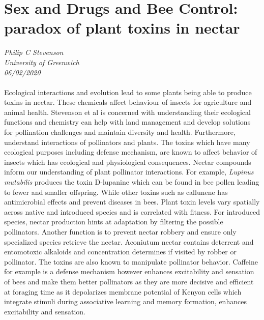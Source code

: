 \documentclass[11pt]{article}
\begin{document}
\section{Sex and Drugs and Bee Control: paradox of plant toxins in nectar}
\textit{Philip C Stevenson\\University of Greenwich\\06/02/2020}
\\
\\Ecological interactions and evolution lead to some plants being able to produce toxins in nectar. These chemicals affect behaviour of insects for agriculture and animal health. Stevenson et al is concerned with understanding their ecological functions and chemistry can help with land management and develop solutions for pollination challenges and maintain diversity and health. Furthermore, understand interactions of pollinators and plants. The toxins which have many ecological purposes including defense mechanism, are known to affect behavior of insects which has ecological and physiological consequences. Nectar compounds inform our understanding of plant pollinator interactions. For example, \textit{Lupinus mutabilis} produces the toxin D-lupanine which can be found in bee pollen leading to fewer and smaller offspring. While other toxins such as callunene has antimicrobial effects and prevent diseases in bees. Plant toxin levels vary spatially across native and introduced species and is correlated with fitness. For introduced species, nectar production hints at adaptation by filtering the possible pollinators. Another function is to prevent nectar robbery and ensure only specialized species retrieve the nectar. Aconiutum nectar contains deterrent and entomotoxic alkaloids and concentration determines if visited by robber or pollinator. The toxins are also known to manipulate pollinator behavior. Caffeine for example is a defense mechanism however enhances excitability and sensation of bees and make them better pollinators as they are more decisive and efficient at foraging time as it depolarizes membrane potential of Kenyon cells which integrate stimuli during associative learning and memory formation, enhances excitability and sensation.
\end{document}
